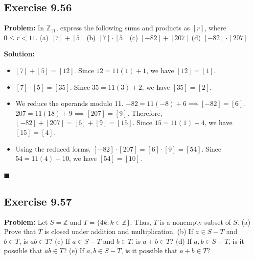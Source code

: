 \documentclass[11pt, a4paper]{article}
\theoremstyle{definition}
\theoremstyle{remark}
\newcommand{\Z}{\mathbb{Z}}
\begin{document}
\subsection{Exercise 9.56}
\textbf{Problem:} In $\Z_{11}$, express the following sums and products as $[r]$, where $0 \le r < 11$.
(a) $[7] + [5]$ \quad (b) $[7] \cdot [5]$ \quad (c) $[-82] + [207]$ \quad (d) $[-82] \cdot [207]$

\textbf{Solution:}
\begin{itemize}
    \item[(a)] $[7] + [5] = [12]$. Since $12 = 11(1) + 1$, we have $[12] = [1]$.
    \item[(b)] $[7] \cdot [5] = [35]$. Since $35 = 11(3) + 2$, we have $[35] = [2]$.
    \item[(c)] We reduce the operands modulo 11. 
    $-82 = 11(-8) + 6 \implies [-82] = [6]$. 
    $207 = 11(18) + 9 \implies [207] = [9]$. 
    Therefore, $[-82] + [207] = [6] + [9] = [15]$. Since $15 = 11(1) + 4$, we have $[15] = [4]$.
    \item[(d)] Using the reduced forms, $[-82] \cdot [207] = [6] \cdot [9] = [54]$. Since $54 = 11(4) + 10$, we have $[54] = [10]$.
\end{itemize}
\hfill $\blacksquare$

\subsection{Exercise 9.57}
\textbf{Problem:} Let $S = \Z$ and $T = \{4k : k \in \Z\}$. Thus, $T$ is a nonempty subset of $S$.
(a) Prove that $T$ is closed under addition and multiplication.
(b) If $a \in S - T$ and $b \in T$, is $ab \in T$?
(c) If $a \in S - T$ and $b \in T$, is $a+b \in T$?
(d) If $a, b \in S - T$, is it possible that $ab \in T$?
(e) If $a, b \in S - T$, is it possible that $a+b \in T$?
\end{document}
